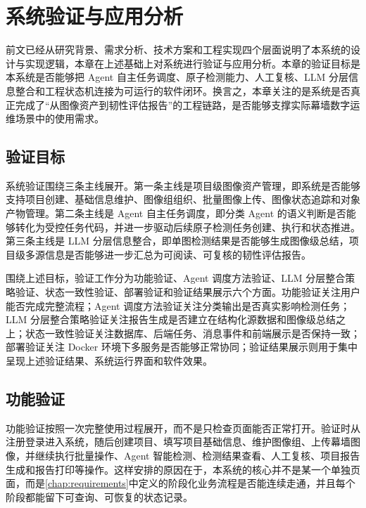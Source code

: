 \chapter{系统验证与应用分析}
\label{chap:validation}

前文已经从研究背景、需求分析、技术方案和工程实现四个层面说明了本系统的设计与实现逻辑，本章在上述基础上对系统进行验证与应用分析。本章的验证目标是本系统是否能够把 Agent 自主任务调度、原子检测能力、人工复核、LLM 分层信息整合和工程状态机连接为可运行的软件闭环。换言之，本章关注的是系统是否真正完成了“从图像资产到韧性评估报告”的工程链路，是否能够支撑实际幕墙数字运维场景中的使用需求。

\section{验证目标}
\label{sec:validation-objective}

系统验证围绕三条主线展开。第一条主线是项目级图像资产管理，即系统是否能够支持项目创建、基础信息维护、图像组组织、批量图像上传、图像状态追踪和对象产物管理。第二条主线是 Agent 自主任务调度，即分类 Agent 的语义判断是否能够转化为受控任务代码，并进一步驱动后续原子检测任务创建、执行和状态推进。第三条主线是 LLM 分层信息整合，即单图检测结果是否能够生成图像级总结，项目级多源信息是否能够进一步汇总为可阅读、可复核的韧性评估报告。

围绕上述目标，验证工作分为功能验证、Agent 调度方法验证、LLM 分层整合策略验证、状态一致性验证、部署验证和验证结果展示六个方面。功能验证关注用户能否完成完整流程；Agent 调度方法验证关注分类输出是否真实影响检测任务；LLM 分层整合策略验证关注报告生成是否建立在结构化源数据和图像级总结之上；状态一致性验证关注数据库、后端任务、消息事件和前端展示是否保持一致；部署验证关注 Docker 环境下多服务是否能够正常协同；验证结果展示则用于集中呈现上述验证结果、系统运行界面和软件效果。

\section{功能验证}
\label{sec:validation-functional-validation}

功能验证按照一次完整使用过程展开，而不是只检查页面能否正常打开。验证时从注册登录进入系统，随后创建项目、填写项目基础信息、维护图像组、上传幕墙图像，并继续执行批量操作、Agent 智能检测、检测结果查看、人工复核、项目报告生成和报告打印等操作。这样安排的原因在于，本系统的核心并不是某一个单独页面，而是\cref{chap:requirements}中定义的阶段化业务流程是否能连续走通，并且每个阶段都能留下可查询、可恢复的状态记录。

